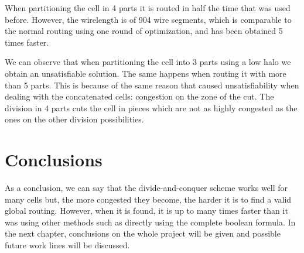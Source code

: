 When partitioning the cell in 4 parts it is routed in half the time that was used before. However, the wirelength is of 904 wire segments, which is comparable to the normal routing using one round of optimization, and has been obtained 5 times faster.


We can observe that when partitioning the cell into 3 parts using a low halo we obtain an unsatisfiable solution. The same happens when routing it with more than 5 parts. This is because of the same reason that caused unsatisfiability when dealing with the concatenated cells: congestion on the zone of the cut. The division in 4 parts cuts the cell in pieces which are not as highly congested as the ones on the other division possibilities. \\


\section{Conclusions}

As a conclusion, we can say that the divide-and-conquer scheme works well for many cells but, the more congested they become, the harder it is to find a valid global routing. However, when it is found, it is up to many times faster than it was using other methods such as directly using the complete boolean formula. In the next chapter, conclusions on the whole project will be given and possible future work lines will be discussed. \\